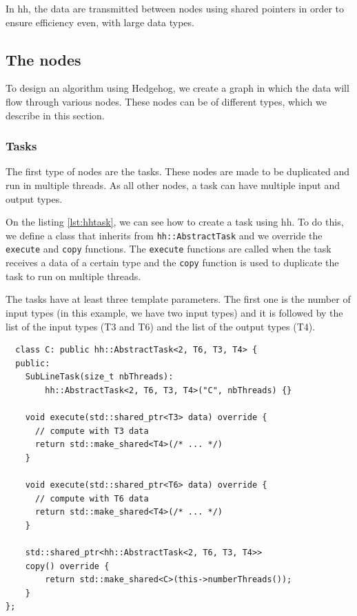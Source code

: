 In \gls{hh}, the data are transmitted between nodes using shared pointers in
order to ensure efficiency even, with large data types.

\subsection{The nodes}

To design an algorithm using Hedgehog, we create a graph in which the data will
flow through various nodes. These nodes can be of different types, which we
describe in this section.

\subsubsection{Tasks}

The first type of nodes are the tasks. These nodes are made to be duplicated and
run in multiple threads. As all other nodes, a task can have multiple input and
output types.

On the listing \ref{lst:hhtask}, we can see how to create a task using \gls{hh}.
To do this, we define a class that inherits from \texttt{hh::AbstractTask} and
we override the \texttt{execute} and \texttt{copy} functions. The
\texttt{execute} functions are called when the task receives a data of a certain
type and the \texttt{copy} function is used to duplicate the task to run on
multiple threads.

The tasks have at least three template parameters. The first one is the number
of input types (in this example, we have two input types) and it is followed by
the list of the input types (T3 and T6) and the list of the output types (T4).

\begin{listing}[ht!]
\begin{verbatim}
  class C: public hh::AbstractTask<2, T6, T3, T4> {
  public:
    SubLineTask(size_t nbThreads):
        hh::AbstractTask<2, T6, T3, T4>("C", nbThreads) {}

    void execute(std::shared_ptr<T3> data) override {
      // compute with T3 data
      return std::make_shared<T4>(/* ... */)
    }

    void execute(std::shared_ptr<T6> data) override {
      // compute with T6 data
      return std::make_shared<T4>(/* ... */)
    }

    std::shared_ptr<hh::AbstractTask<2, T6, T3, T4>>
    copy() override {
        return std::make_shared<C>(this->numberThreads());
    }
};
\end{verbatim}
\label{lst:hhtask}
\end{listing}

